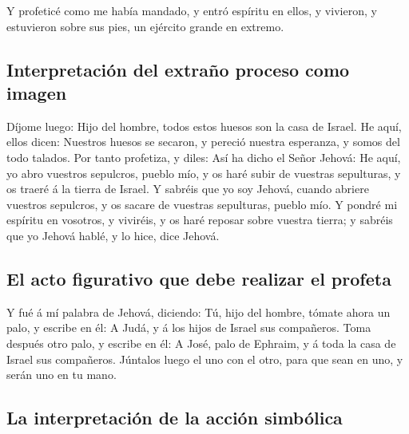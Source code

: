  Y profeticé como me había mandado, y entró espíritu en
ellos, y vivieron, y estuvieron sobre sus pies, un ejército grande en
extremo.

\hypertarget{interpretaciuxf3n-del-extrauxf1o-proceso-como-imagen}{%
\subsection{Interpretación del extraño proceso como
imagen}\label{interpretaciuxf3n-del-extrauxf1o-proceso-como-imagen}}

 Díjome luego: Hijo del hombre, todos estos huesos son la
casa de Israel. He aquí, ellos dicen: Nuestros huesos se secaron, y
pereció nuestra esperanza, y somos del todo talados.  Por
tanto profetiza, y diles: Así ha dicho el Señor Jehová: He aquí, yo abro
vuestros sepulcros, pueblo mío, y os haré subir de vuestras sepulturas,
y os traeré á la tierra de Israel.  Y sabréis que yo soy
Jehová, cuando abriere vuestros sepulcros, y os sacare de vuestras
sepulturas, pueblo mío.  Y pondré mi espíritu en
vosotros, y viviréis, y os haré reposar sobre vuestra tierra; y sabréis
que yo Jehová hablé, y lo hice, dice Jehová.

\hypertarget{el-acto-figurativo-que-debe-realizar-el-profeta}{%
\subsection{El acto figurativo que debe realizar el
profeta}\label{el-acto-figurativo-que-debe-realizar-el-profeta}}

 Y fué á mí palabra de Jehová, diciendo: 
Tú, hijo del hombre, tómate ahora un palo, y escribe en él: A Judá, y á
los hijos de Israel sus compañeros. Toma después otro palo, y escribe en
él: A José, palo de Ephraim, y á toda la casa de Israel sus compañeros.
 Júntalos luego el uno con el otro, para que sean en uno,
y serán uno en tu mano.

\hypertarget{la-interpretaciuxf3n-de-la-acciuxf3n-simbuxf3lica}{%
\subsection{La interpretación de la acción
simbólica}\label{la-interpretaciuxf3n-de-la-acciuxf3n-simbuxf3lica}}

